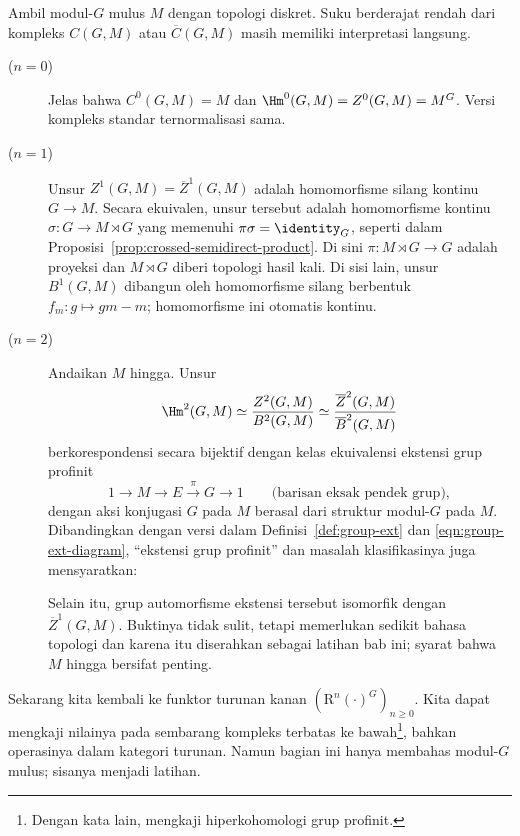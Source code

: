 Ambil modul-$G$ mulus $M$ dengan topologi diskret. Suku berderajat rendah dari
kompleks $C(G,M)$ atau $\overline{C}(G,M)$ masih memiliki interpretasi
langsung.
\begin{description}
	\item[($n=0$)] Jelas bahwa $C^0(G,M)=M$ dan
	$\Hm^0(G,M)=Z^0(G,M)=M^G$. Versi kompleks standar ternormalisasi sama.
	\item[($n=1$)] Unsur $Z^1(G,M)=\overline{Z}^1(G,M)$ adalah homomorfisme
	silang kontinu $G\to M$. Secara ekuivalen, unsur tersebut adalah
	homomorfisme kontinu $\sigma:G\to M\rtimes G$ yang memenuhi
	$\pi\sigma=\identity_G$, seperti dalam
	Proposisi~\ref{prop:crossed-semidirect-product}. Di sini
	$\pi:M\rtimes G\to G$ adalah proyeksi dan $M\rtimes G$ diberi topologi
	hasil kali. Di sisi lain, unsur $B^1(G,M)$ dibangun oleh homomorfisme silang
	berbentuk $f_m:g\mapsto gm-m$; homomorfisme ini otomatis kontinu.

	\item[($n=2$)] Andaikan $M$ hingga. Unsur
	\[ \Hm^2(G,M)\simeq\frac{Z^2(G,M)}{B^2(G,M)}
	\simeq\frac{\overline{Z}^2(G,M)}{\overline{B}^2(G,M)} \]
	berkorespondensi secara bijektif dengan kelas ekuivalensi ekstensi grup profinit
	\[ 1\to M\to E\xrightarrow{\pi}G\to1
	\qquad\text{(barisan eksak pendek grup)}, \]
	dengan aksi konjugasi $G$ pada $M$ berasal dari struktur modul-$G$ pada
	$M$. Dibandingkan dengan versi dalam Definisi~\ref{def:group-ext} dan
	\eqref{eqn:group-ext-diagram}, ``ekstensi grup profinit'' dan masalah
	klasifikasinya juga mensyaratkan:

	Selain itu, grup automorfisme ekstensi tersebut isomorfik dengan
	$\overline{Z}^1(G,M)$. Buktinya tidak sulit, tetapi memerlukan sedikit
	bahasa topologi dan karena itu diserahkan sebagai latihan bab ini; syarat
	bahwa $M$ hingga bersifat penting.
\end{description}

Sekarang kita kembali ke funktor turunan kanan
$(\mathrm{R}^n(\cdot)^G)_{n\geq0}$. Kita dapat mengkaji nilainya pada sembarang
kompleks terbatas ke bawah\footnote{Dengan kata lain, mengkaji hiperkohomologi
grup profinit.}, bahkan operasinya dalam kategori turunan. Namun bagian ini
hanya membahas modul-$G$ mulus; sisanya menjadi latihan.

